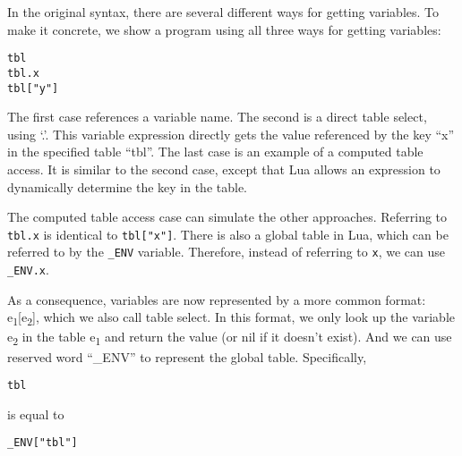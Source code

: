 In the original syntax,
there are several different ways for getting variables.
To make it concrete, we show a program using all three ways for getting variables:

\begin{verbatim}
tbl
tbl.x
tbl["y"]
\end{verbatim}

The first case references a variable name.
The second is a direct table select, using `.'.
This variable expression directly gets the value referenced by the key ``x'' in the specified table ``tbl''.
The last case is an example of a computed table access.
It is similar to the second case, except that Lua allows an expression to dynamically determine the key in the table.

The computed table access case can simulate the other approaches.
Referring to {\tt tbl.x} is identical to {\tt tbl["x"]}.
There is also a global table in Lua, which can be referred to by the {\tt \_ENV} variable.
Therefore, instead of referring to {\tt x}, we can use {\tt \_ENV.x}.

As a consequence, variables are now represented by a more common format: e\textsubscript{1}[e\textsubscript{2}], which we also call table select. In this format, we only look up the variable e\textsubscript{2} in the table e\textsubscript{1} and return the value (or nil if it doesn't exist). And we can use reserved word ``\_ENV'' to represent the global table. Specifically,

\begin{verbatim}
tbl
\end{verbatim}
is equal to
\begin{verbatim}
_ENV["tbl"]
\end{verbatim}

